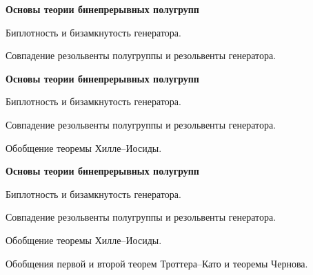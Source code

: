 \documentclass[11pt]{article}
\begin{document}
\begin{center}
{\color{notaeYELLOW}\bfseries\fontsize{44}{52}\selectfont Основы теории бинепрерывных полугрупп}
\end{center}
\vspace*{\fill}
\begin{center}
\fontsize{36}{43}\selectfont
\parbox{\linewidth}{\centering\noindent Биплотность и бизамкнутость генератора.
\par}\vspace{0.4in}
\parbox{\linewidth}{\centering\noindent Совпадение резольвенты полугруппы и резольвенты генератора.
\par}\vspace{0.4in}
\end{center}
\vspace*{\fill}

\newpage

\begin{center}
{\color{notaeYELLOW}\bfseries\fontsize{44}{52}\selectfont Основы теории бинепрерывных полугрупп}
\end{center}
\vspace*{\fill}
\begin{center}
\fontsize{36}{43}\selectfont
\parbox{\linewidth}{\centering\noindent Биплотность и бизамкнутость генератора.
\par}\vspace{0.4in}
\parbox{\linewidth}{\centering\noindent Совпадение резольвенты полугруппы и резольвенты генератора.
\par}\vspace{0.4in}
\parbox{\linewidth}{\centering\noindent Обобщение теоремы Хилле--Иосиды.
\par}\vspace{0.4in}
\end{center}
\vspace*{\fill}

\newpage

\begin{center}
{\color{notaeYELLOW}\bfseries\fontsize{44}{52}\selectfont Основы теории бинепрерывных полугрупп}
\end{center}
\vspace*{\fill}
\begin{center}
\fontsize{36}{43}\selectfont
\parbox{\linewidth}{\centering\noindent Биплотность и бизамкнутость генератора.
\par}\vspace{0.4in}
\parbox{\linewidth}{\centering\noindent Совпадение резольвенты полугруппы и резольвенты генератора.
\par}\vspace{0.4in}
\parbox{\linewidth}{\centering\noindent Обобщение теоремы Хилле--Иосиды.
\par}\vspace{0.4in}
\parbox{\linewidth}{\centering\noindent Обобщения первой и второй теорем Троттера--Като и теоремы Чернова.
\par}\vspace{0.4in}
\end{center}
\vspace*{\fill}
\end{document}
